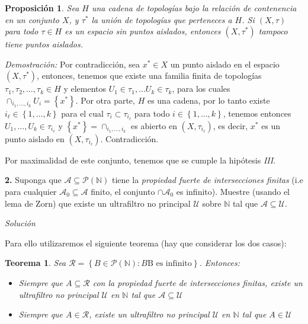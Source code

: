 \documentclass[11pt,a4paper,draft]{article}
\newtheorem{prop}{Proposición}
\newtheorem{theorem}{Teorema}
\newcommand{\set}[1]{\left\lbrace #1 \right\rbrace}
\begin{document}
\begin{prop}
	Sea $ H $ una cadena de topologías bajo la relación de contenencia en un conjunto $ X $, y $ \tau^* $ la unión de topologías que perteneces a $ H $. Si $ (X,\tau) $ para todo $ \tau \in H $ es un espacio sin puntos aislados, entonces $ (X,\tau^*) $ tampoco tiene puntos aislados.
\end{prop}

\textit{Demostración:} Por contradicción, sea $ x^* \in X $ un punto aislado en el espacio $ (X,\tau^*) $, entonces, tenemos que existe una familia finita de topologías $ \tau_1 , \tau_2, \ldots, \tau_k \in H$ y elementos $ U_1 \in \tau_1, \ldots U_k \in \tau_k $,  para los cuales $ \cap_{i_1, \ldots, i_k} U_i = \set{x^*}  $. Por otra parte, $ H $ es una cadena, por lo tanto existe $ i_\ell \in \set{1, \ldots, k} $ para el cual $ \tau_i \subset \tau_{i_\ell}  $ para todo $ i \in \set{1, \ldots, k}  $, tenemos entonces $ U_1, \ldots, U_k \in \tau_{i_\ell} $ y $ \set{x^*} = \cap_{i_1, \ldots, i_k} $ es abierto en $ (X, \tau_{i_\ell}) $, es decir, $ x^* $ es un punto aislado en $ (X,\tau_{i_\ell}) $. Contradicción.

Por maximalidad de este conjunto, tenemos que se cumple la hipótesis \textit{III}. 

\singlespacing

\textbf{2.} Suponga que $ \mathcal{A} \subseteq \mathcal{P}(\mathbb{N}) $ tiene la \emph{propiedad fuerte de intersecciones finitas} (i.e para cualquier $ \mathcal{A_0} \subseteq \mathcal{A} $ finito, el conjunto $ \cap \mathcal{A_0}  $ es infinito). Muestre (usando el lema de Zorn) que existe un ultrafiltro no principal $ \mathcal{U} $ sobre $ \mathbb{N} $ tal que $ \mathcal{A} \subseteq \mathcal{U} $. 

\textit{Solución}

Para ello utilizaremos el siguiente teorema (hay que considerar los dos casos):

\begin{theorem}
	Sea $ \mathcal{R} = \set{B \in \mathcal{P}(\mathbb{N}): B \textrm{B es infinito}} $. Entonces:
	\begin{itemize}
		\item Siempre que $ A \subseteq \mathcal{R} $ con la \emph{propiedad fuerte de intersecciones finitas}, existe un ultrafiltro no principal $ \mathcal{U} $ en $ \mathbb{N} $ tal que $ \mathcal{A} \subseteq \mathcal{U} $
		\item Siempre que $ A \in \mathcal{R} $, existe un ultrafiltro no principal $ \mathcal{U} $ en $ \mathbb{N} $ tal que $ A \in \mathcal{U} $
	\end{itemize}
\end{theorem}
\end{document}
